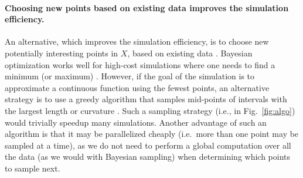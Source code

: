 \documentclass[english, twocolumn, 10pt, aps, superscriptaddress, floatfix, prb, citeautoscript]{revtex4-1}
\renewcommand{\citep}{\cite}
\begin{document}
\paragraph{Choosing new points based on existing data improves the simulation efficiency.}

An alternative, which improves the simulation efficiency, is to choose new potentially interesting points in \(X\), based on existing data \citep{Gramacy2004, Figueiredo1995, Castro2008, Chen2017}.
Bayesian optimization works well for high-cost simulations where one needs to find a minimum (or maximum) \citep{Takhtaganov2018}.
However, if the goal of the simulation is to approximate a continuous function using the fewest points, an alternative strategy is to use a greedy algorithm that samples mid-points of intervals with the largest length or curvature \citep{Wolfram2011}.
Such a sampling strategy (i.e., in Fig.~\ref{fig:algo}) would trivially speedup many simulations.
Another advantage of such an algorithm is that it may be parallelized cheaply (i.e.~more than one point may be sampled at a time), as we do not need to perform a global computation over all the data (as we would with Bayesian sampling) when determining which points to sample next.
\end{document}
